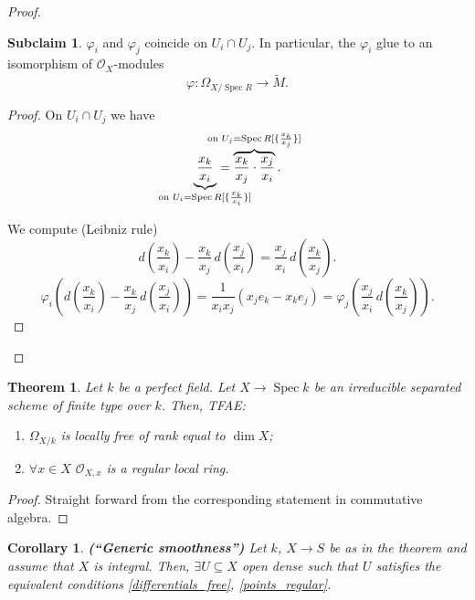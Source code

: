\documentclass[12pt]{article}
\DeclareMathOperator{\Spec}{Spec}
\newtheorem*{theorem}{Theorem}
\newtheorem*{corollary}{Corollary}
\theoremstyle{definition}
\newtheorem{subclaim}{Subclaim}
\theoremstyle{remark}
\newtheorem*{comment}{Comment}
\begin{document}
\begin{proof}
\begin{subclaim}
$\varphi_i$ and $\varphi_j$ coincide on $U_i\cap U_j$. In particular, the $\varphi_i$ glue to an isomorphism of $\mathcal{O}_X$-modules
\[\varphi:\Omega_{X/\Spec R}\longrightarrow\widetilde{M}.\]
\end{subclaim}

\begin{proof}
On $U_i\cap U_j$ we have
\[\underbrace{\frac{x_k}{x_i}}_{\mathclap{\text{on }U_i=\Spec R[\{\frac{x_k}{x_i}\}]}}=\overbrace{\frac{x_k}{x_j}\cdot\frac{x_j}{x_i}}^{\mathclap{\text{on }U_j=\Spec R[\{\frac{x_k}{x_j}\}]}}.\]

We compute (Leibniz rule)
\[d\left(\frac{x_k}{x_i}\right)-\frac{x_k}{x_j}\,d\left(\frac{x_j}{x_i}\right)=\frac{x_j}{x_i}\,d\left(\frac{x_k}{x_j}\right).\]
\[\varphi_i\left(d\left(\frac{x_k}{x_i}\right)-\frac{x_k}{x_j}\,d\left(\frac{x_j}{x_i}\right)\right)=\frac{1}{x_ix_j}(x_je_k-x_ke_j)=\varphi_j\left(\frac{x_j}{x_i}\,d\left(\frac{x_k}{x_j}\right)\right).\]
\end{proof}
\end{proof}

\begin{theorem}
Let $k$ be a perfect field. Let $X\rightarrow\Spec k$ be an irreducible separated scheme of finite type over $k$. Then, TFAE:
\begin{enumerate}[label=\arabic*)]
\item\label{differentials_free} $\Omega_{X/k}$ is locally free of rank equal to $\dim X$;
\item\label{points_regular} $\forall x\in X$ $\mathcal{O}_{X,x}$ is a regular local ring.
\end{enumerate}
\end{theorem}

\begin{proof}
Straight forward from the corresponding statement in commutative algebra.
\end{proof}

\begin{corollary}
\emph{\textbf{(``Generic smoothness'')}} Let $k$, $X\rightarrow S$ be as in the theorem and assume that $X$ is integral. Then, $\exists U\subseteq X$ open dense such that $U$ satisfies the equivalent conditions \ref{differentials_free}, \ref{points_regular}.
\end{corollary}

\begin{comment}
Intuitively, there are few singular points: in a dense subset the scheme is regular.
\end{comment}
\end{document}
